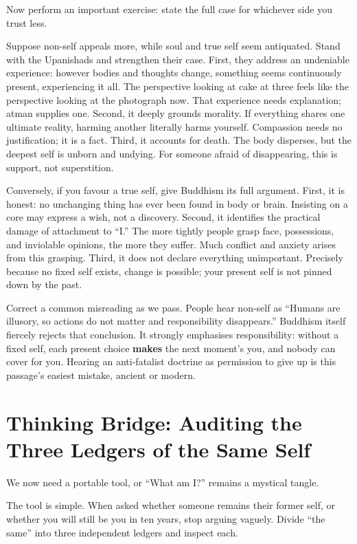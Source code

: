 Now perform an important exercise: state the full case for whichever side you trust less.

Suppose non-self appeals more, while soul and true self seem antiquated. Stand with the Upanishads and strengthen their case. First, they address an undeniable experience: however bodies and thoughts change, something seems continuously present, experiencing it all. The perspective looking at cake at three feels like the perspective looking at the photograph now. That experience needs explanation; atman supplies one. Second, it deeply grounds morality. If everything shares one ultimate reality, harming another literally harms yourself. Compassion needs no justification; it is a fact. Third, it accounts for death. The body disperses, but the deepest self is unborn and undying. For someone afraid of disappearing, this is support, not superstition.

Conversely, if you favour a true self, give Buddhism its full argument. First, it is honest: no unchanging thing has ever been found in body or brain. Insisting on a core may express a wish, not a discovery. Second, it identifies the practical damage of attachment to ``I.'' The more tightly people grasp face, possessions, and inviolable opinions, the more they suffer. Much conflict and anxiety arises from this grasping. Third, it does not declare everything unimportant. Precisely because no fixed self exists, change is possible; your present self is not pinned down by the past.

Correct a common misreading as we pass. People hear non-self as ``Humans are illusory, so actions do not matter and responsibility disappears.'' Buddhism itself fiercely rejects that conclusion. It strongly emphasises responsibility: without a fixed self, each present choice \textbf{makes} the next moment's you, and nobody can cover for you. Hearing an anti-fatalist doctrine as permission to give up is this passage's easiest mistake, ancient or modern.

\section[Thinking Bridge: Three Identity Ledgers]{Thinking Bridge: Auditing the Three Ledgers of the Same Self}
We now need a portable tool, or ``What am I?'' remains a mystical tangle.

The tool is simple. When asked whether someone remains their former self, or whether you will still be you in ten years, stop arguing vaguely. Divide ``the same'' into three independent ledgers and inspect each.

